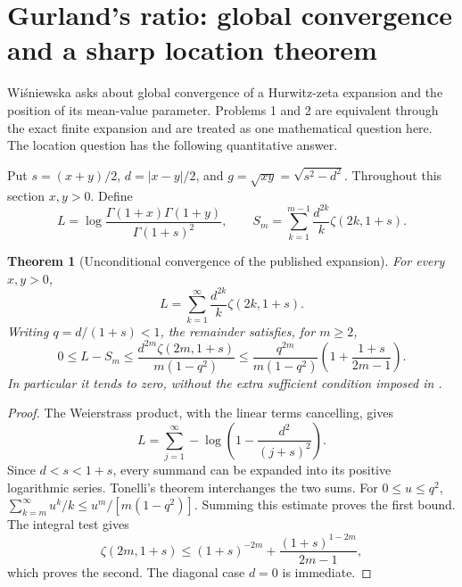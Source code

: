 \documentclass[11pt,a4paper]{article}
\newtheorem{theorem}{Theorem}[section]
\theoremstyle{definition}
\theoremstyle{remark}
\numberwithin{equation}{section}
\begin{document}


\section{Gurland's ratio: global convergence and a sharp location theorem}
\label{p2:sec:gurland2}

Wi\'sniewska \cite[Section 2, Open problems 1--3]{p2:Wis2025} asks about
global convergence of a Hurwitz-zeta expansion and the position of its
mean-value parameter. Problems 1 and 2 are equivalent through the exact
finite expansion and are treated as one mathematical question here.
The location question has the following quantitative answer.

Put $s=(x+y)/2$, $d=|x-y|/2$, and $g=\sqrt{xy}=\sqrt{s^2-d^2}$.
Throughout this section $x,y>0$. Define
\[
 L=\log\frac{\Gamma(1+x)\Gamma(1+y)}{\Gamma(1+s)^2},\qquad
 S_m=\sum_{k=1}^{m-1}\frac{d^{2k}}{k}\zeta(2k,1+s).
\]

\begin{theorem}[Unconditional convergence of the published expansion]
For every $x,y>0$,
\[
 L=\sum_{k=1}^{\infty}\frac{d^{2k}}{k}\zeta(2k,1+s).
\]
Writing $q=d/(1+s)<1$, the remainder satisfies, for $m\ge2$,
\[
 0\le L-S_m\le
 \frac{d^{2m}\zeta(2m,1+s)}{m(1-q^2)}
 \le\frac{q^{2m}}{m(1-q^2)}
       \left(1+\frac{1+s}{2m-1}\right).
\]
In particular it tends to zero, without the extra sufficient condition
imposed in \cite[Corollary 1]{p2:Wis2025}.
\end{theorem}
\begin{proof}
The Weierstrass product, with the linear terms cancelling, gives
\[
 L=\sum_{j=1}^{\infty}-\log\left(1-\frac{d^2}{(j+s)^2}\right).
\]
Since $d<s<1+s$, every summand can be expanded into its positive
logarithmic series. Tonelli's theorem interchanges the two sums.
For $0\le u\le q^2$,
$\sum_{k=m}^{\infty}u^k/k\le u^m/[m(1-q^2)]$.
Summing this estimate proves the first bound. The integral test gives
\[
 \zeta(2m,1+s)\le(1+s)^{-2m}
       +\frac{(1+s)^{1-2m}}{2m-1},
\]
which proves the second. The diagonal case $d=0$ is immediate.
\end{proof}
\end{document}
